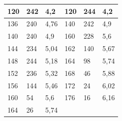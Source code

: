 \documentclass[a4paper,12pt]{article}
\begin{document}
\begin{table}[h]
\begin{center}
\begin{tabular}{|lll|lll|}
\multicolumn{1}{|l|}{120}                                              & \multicolumn{1}{l|}{242}                      & 4,2                      & \multicolumn{1}{l|}{120}                      & \multicolumn{1}{l|}{244}                      & 4,2                      \\ \hline
\multicolumn{1}{|l|}{136}                                              & \multicolumn{1}{l|}{240}                      & 4,76                     & \multicolumn{1}{l|}{140}                      & \multicolumn{1}{l|}{242}                      & 4,9                      \\ \hline
\multicolumn{1}{|l|}{140}                                              & \multicolumn{1}{l|}{240}                      & 4,9                      & \multicolumn{1}{l|}{160}                      & \multicolumn{1}{l|}{228}                      & 5,6                      \\ \hline
\multicolumn{1}{|l|}{144}                                              & \multicolumn{1}{l|}{234}                      & 5,04                     & \multicolumn{1}{l|}{162}                      & \multicolumn{1}{l|}{140}                      & 5,67                     \\ \hline
\multicolumn{1}{|l|}{148}                                              & \multicolumn{1}{l|}{244}                      & 5,18                     & \multicolumn{1}{l|}{164}                      & \multicolumn{1}{l|}{98}                       & 5,74                     \\ \hline
\multicolumn{1}{|l|}{152}                                              & \multicolumn{1}{l|}{236}                      & 5,32                     & \multicolumn{1}{l|}{168}                      & \multicolumn{1}{l|}{46}                       & 5,88                     \\ \hline
\multicolumn{1}{|l|}{156}                                              & \multicolumn{1}{l|}{144}                      & 5,46                     & \multicolumn{1}{l|}{172}                      & \multicolumn{1}{l|}{24}                       & 6,02                     \\ \hline
\multicolumn{1}{|l|}{160}                                              & \multicolumn{1}{l|}{54}                       & 5,6                      & \multicolumn{1}{l|}{176}                      & \multicolumn{1}{l|}{16}                       & 6,16                     \\ \hline
\multicolumn{1}{|l|}{164}                                              & \multicolumn{1}{l|}{26}                       & 5,74                     & \multicolumn{1}{l|}{}                         & \multicolumn{1}{l|}{}                         &                          \\ \hline

\end{tabular}
\end{center}
\end{table}
\end{document}
